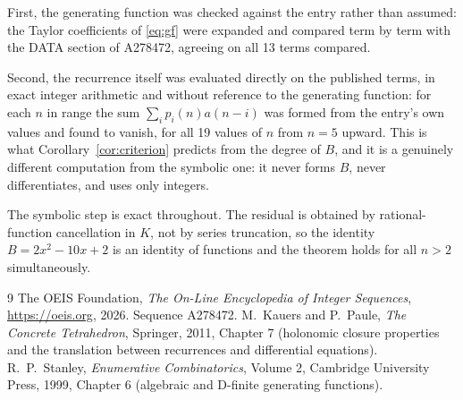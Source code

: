\documentclass[11pt,a4paper]{article}
\theoremstyle{plain}
\theoremstyle{definition}
\begin{document}
First, the generating function was checked against the entry rather than assumed: the
Taylor coefficients of \eqref{eq:gf} were expanded and compared term by term with the DATA
section of A278472, agreeing on all 13 terms compared.

Second, the recurrence itself was evaluated directly on the published terms, in exact
integer arithmetic and without reference to the generating function: for each $n$ in range
the sum $\sum_{i}p_{i}(n)a(n-i)$ was formed from the entry's own values and found to
vanish, for all 19 values of $n$ from $n=5$ upward. This is what
Corollary~\ref{cor:criterion} predicts from the degree of $B$, and it is a genuinely
different computation from the symbolic one: it never forms $B$, never differentiates, and
uses only integers.

The symbolic step is exact throughout. The residual is obtained by rational-function
cancellation in $K$, not by series truncation, so the identity $B=2 x^{2} - 10 x + 2$ is an
identity of functions and the theorem holds for all $n>2$ simultaneously.

\begin{thebibliography}{9}
 The OEIS Foundation, \emph{The On-Line Encyclopedia of Integer Sequences},
\url{https://oeis.org}, 2026. Sequence A278472.
 M.~Kauers and P.~Paule, \emph{The Concrete Tetrahedron}, Springer, 2011,
Chapter 7 (holonomic closure properties and the translation between recurrences and
differential equations).
 R.~P.~Stanley, \emph{Enumerative Combinatorics}, Volume 2, Cambridge
University Press, 1999, Chapter 6 (algebraic and D-finite generating functions).
\end{thebibliography}
\end{document}
